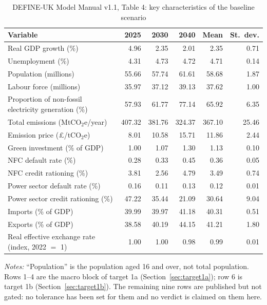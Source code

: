\begin{table}[h]
\centering
\caption{DEFINE-UK Model Manual v1.1, Table 4: key characteristics of the baseline scenario}
\label{tab:table4}
\footnotesize
\begin{tabular}{@{}lrrrrr@{}}
\toprule
Variable & 2025 & 2030 & 2040 & Mean & St.\ dev. \\
\midrule
Real GDP growth (\%) & 4.96 & 2.35 & 2.01 & 2.35 & 0.71 \\
Unemployment (\%) & 4.31 & 4.73 & 4.72 & 4.71 & 0.14 \\
Population (millions) & 55.66 & 57.74 & 61.61 & 58.68 & 1.87 \\
Labour force (millions) & 35.97 & 37.12 & 39.13 & 37.62 & 1.00 \\
Proportion of non-fossil electricity generation (\%) & 57.93 & 61.77 & 77.14 & 65.92 & 6.35 \\
Total emissions (MtCO$_2$e/year) & 407.32 & 381.76 & 324.37 & 367.10 & 25.46 \\
Emission price (\pounds/tCO$_2$e) & 8.01 & 10.58 & 15.71 & 11.86 & 2.44 \\
Green investment (\% of GDP) & 1.00 & 1.07 & 1.30 & 1.13 & 0.10 \\
NFC default rate (\%) & 0.28 & 0.33 & 0.45 & 0.36 & 0.05 \\
NFC credit rationing (\%) & 3.81 & 2.56 & 4.79 & 3.49 & 0.74 \\
Power sector default rate (\%) & 0.16 & 0.11 & 0.13 & 0.12 & 0.01 \\
Power sector credit rationing (\%) & 47.22 & 35.44 & 21.09 & 30.64 & 9.04 \\
Imports (\% of GDP) & 39.99 & 39.97 & 41.18 & 40.31 & 0.51 \\
Exports (\% of GDP) & 38.58 & 40.19 & 44.15 & 41.21 & 1.80 \\
Real effective exchange rate (index, 2022 $=$ 1) & 1.00 & 1.00 & 0.98 & 0.99 & 0.01 \\
\bottomrule
\end{tabular}
\par\smallskip
\parbox{0.95\textwidth}{\footnotesize \emph{Notes:} ``Population'' is the population aged 16 and over, not total population. Rows 1--4 are the macro block of target 1a (Section~\ref{sec:target1a}); row 6 is target 1b (Section~\ref{sec:target1b}). The remaining nine rows are published but not gated: no tolerance has been set for them and no verdict is claimed on them here.}
\end{table}

